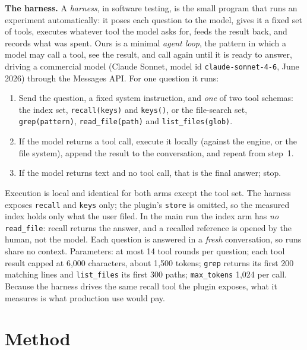 \documentclass[11pt]{article}
\newcommand{\code}[1]{\texttt{#1}}
\begin{document}
\textbf{The harness.} A \emph{harness}, in software testing, is the small program
that runs an experiment automatically: it poses each question to the model, gives
it a fixed set of tools, executes whatever tool the model asks for, feeds the
result back, and records what was spent. Ours is a minimal \emph{agent loop}, the
pattern in which a model may call a tool, see the result, and call again until it
is ready to answer, driving a commercial model (Claude Sonnet, model id
\code{claude-sonnet-4-6}, June 2026) through the Messages API. For one question it runs:
\begin{enumerate}
\item Send the question, a fixed system instruction, and \emph{one} of two tool
schemas: the index set, \code{recall(keys)} and \code{keys()}, or the file-search
set, \code{grep(pattern)}, \code{read\_file(path)} and \code{list\_files(glob)}.
\item If the model returns a tool call, execute it locally (against the engine, or
the file system), append the result to the conversation, and repeat from step~1.
\item If the model returns text and no tool call, that is the final answer; stop.
\end{enumerate}
Execution is local and identical for both arms except the tool set. The harness
exposes \code{recall} and \code{keys} only; the plugin's \code{store} is omitted, so
the measured index holds only what the user filed. In the
main run the index arm has \emph{no} \code{read\_file}: recall returns
the answer, and a recalled reference is opened by the human, not the model. Each
question is answered in a \emph{fresh} conversation, so runs share no context.
Parameters: at most 14 tool rounds per question; each tool result capped at
6{,}000 characters, about 1{,}500 tokens; \code{grep} returns its first 200
matching lines and \code{list\_files} its first 300 paths; \code{max\_tokens}
1{,}024 per call.
Because the harness drives the same recall tool the plugin exposes, what it
measures is what production use would pay.

\section{Method}
\label{sec:method}
\end{document}
